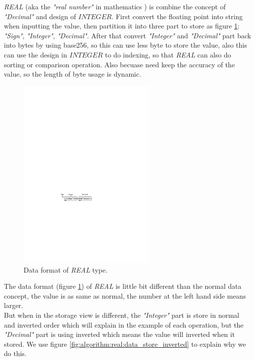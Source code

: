 \textit{REAL} (aka the \textit{"real number"} in mathematics \cite{web:wiki:real-number}) is combine the concept of \textit{"Decimal"} and design of $INTEGER$. First convert the floating point into string when inputting the value, then partition it into three part to store as figure \ref{fig:algorithm:real:data_format}: \textit{"Sign"}, \textit{"Integer"}, \textit{"Decimal"}. After that convert \textit{"Integer"} and \textit{"Decimal"} part back into bytes by using base256, so this can use less byte to store the value, also this can use the design in $INTEGER$ to do indexing, so that \textit{REAL} can also do sorting or comparison operation. Also becuase need keep the accuracy of the value, so the length of byte usage is dynamic.\\

\begin{figure}[h]
\centering
\includegraphics[width=0.6\textwidth]{./algorithm/real/pic/design/data_format_v3.pdf}
\caption{Data format of \textit{REAL} type.}
\label{fig:algorithm:real:data_format}
\end{figure}

The data format (figure \ref{fig:algorithm:real:data_format}) of \textit{REAL} is little bit different than the normal data concept, the value is as same as normal, the number at the left hand side means larger.\\

But when in the storage view is different, the \textit{"Integer"} part is store in normal and inverted order which will explain in the example of each operation, but the \textit{"Decimal"} part is using inverted which means the value will inverted when it stored. We use figure \ref{fig:algorithm:real:data_store_inverted} to explain why we do this.

